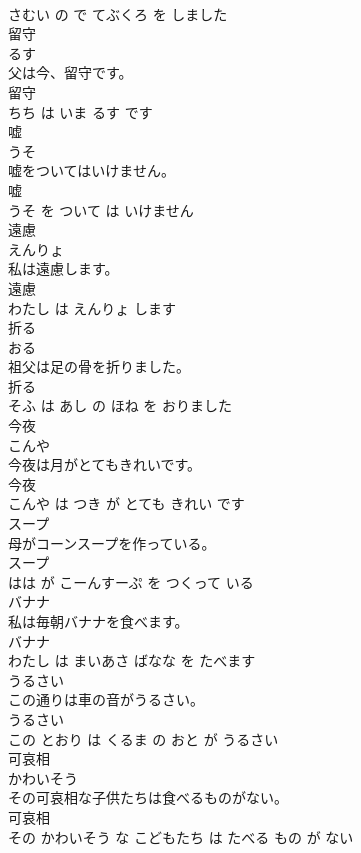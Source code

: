 \documentclass[8pt]{extreport}
\begin{document}
\begin{CJK}{UTF8}{min}
\\	さむい の で てぶくろ を しました			
\\	留守	
\\	るす			
\\	父は今、留守です。	
\\	留守 
\\	ちち は いま るす です			
\\	嘘	
\\	うそ			
\\	嘘をついてはいけません。	
\\	嘘 
\\	うそ を ついて は いけません			
\\	遠慮	
\\	えんりょ			
\\	私は遠慮します。	
\\	遠慮 
\\	わたし は えんりょ します			
\\	折る	
\\	おる			
\\	祖父は足の骨を折りました。	
\\	折る 
\\	そふ は あし の ほね を おりました			
\\	今夜	
\\	こんや			
\\	今夜は月がとてもきれいです。	
\\	今夜 
\\	こんや は つき が とても きれい です			
\\	スープ	
\\	母がコーンスープを作っている。	
\\	スープ 
\\	はは が こーんすーぷ を つくって いる			
\\	バナナ	
\\	私は毎朝バナナを食べます。	
\\	バナナ 
\\	わたし は まいあさ ばなな を たべます			
\\	うるさい	
\\	この通りは車の音がうるさい。	
\\	うるさい 
\\	この とおり は くるま の おと が うるさい			
\\	可哀相	
\\	かわいそう			
\\	その可哀相な子供たちは食べるものがない。	
\\	可哀相 
\\	その かわいそう な こどもたち は たべる もの が ない			

\end{CJK}
\end{document}
